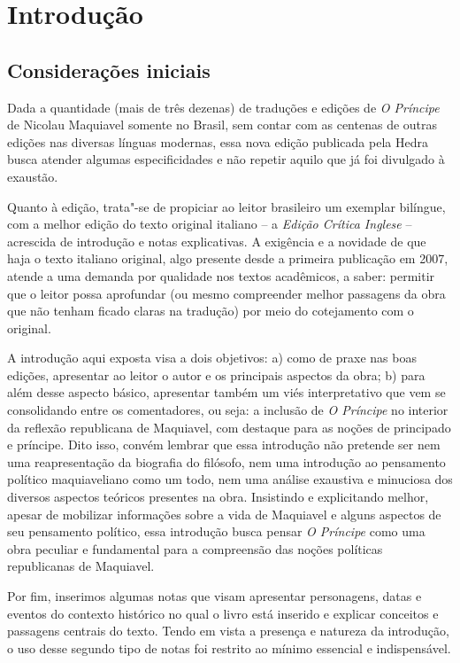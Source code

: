 \chapter*{Introdução} %

\section{Considerações iniciais}

Dada a quantidade (mais de três dezenas) de traduções e edições de
\emph{O Príncipe} de Nicolau Maquiavel somente no Brasil, sem contar com
as centenas de outras edições nas diversas línguas modernas, essa nova
edição publicada pela Hedra busca atender algumas especificidades e não
repetir aquilo que já foi divulgado à exaustão.

Quanto à edição, trata"-se de propiciar ao leitor brasileiro um exemplar
bilíngue, com a melhor edição do texto original italiano -- a
\emph{Edição Crítica Inglese} -- acrescida de introdução e notas
explicativas. A exigência e a novidade de que haja o texto italiano
original, algo presente desde a primeira publicação em 2007, atende a
uma demanda por qualidade nos textos acadêmicos, a saber: permitir que o
leitor possa aprofundar (ou mesmo compreender melhor passagens da obra
que não tenham ficado claras na tradução) por meio do cotejamento com o
original.

A introdução aqui exposta visa a dois objetivos: a) como de praxe nas
boas edições, apresentar ao leitor o autor e os principais aspectos da
obra; b) para além desse aspecto básico, apresentar também um viés
interpretativo que vem se consolidando entre os comentadores, ou seja: a
inclusão de \emph{O Príncipe} no interior da reflexão republicana de
Maquiavel, com destaque para as noções de principado e príncipe. Dito
isso, convém lembrar que essa introdução não pretende ser nem uma
reapresentação da biografia do filósofo, nem uma introdução ao
pensamento político maquiaveliano como um todo, nem uma análise
exaustiva e minuciosa dos diversos aspectos teóricos presentes na obra.
Insistindo e explicitando melhor, apesar de mobilizar informações sobre
a vida de Maquiavel e alguns aspectos de seu pensamento político, essa
introdução busca pensar \emph{O Príncipe} como uma obra peculiar e
fundamental para a compreensão das noções políticas republicanas de
Maquiavel.

Por fim, inserimos algumas notas que visam apresentar personagens, datas
e eventos do contexto histórico no qual o livro está inserido e explicar
conceitos e passagens centrais do texto. Tendo em vista a presença e
natureza da introdução, o uso desse segundo tipo de notas foi restrito
ao mínimo essencial e indispensável.

